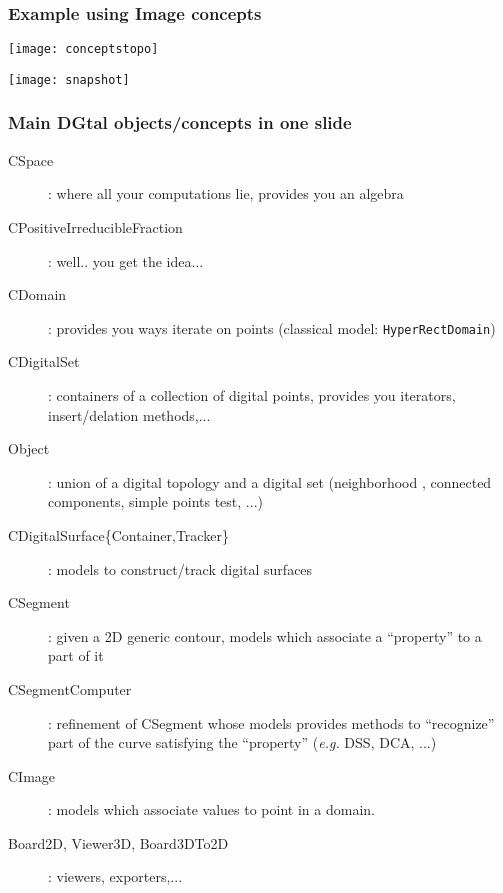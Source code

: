 \documentclass[8pt]{beamer}
\begin{document}
\begin{frame}
\frametitle{Example using Image concepts}
  \centering \texttt{[image: conceptstopo]}
\end{frame}



\begin{frame}
  \centering \texttt{[image: snapshot]}
\end{frame}

\begin{frame}
  \frametitle{Main DGtal objects/concepts in one slide}

  \begin{description}
    \item[CSpace]: where all your computations lie, provides you an algebra 

    \item[CPositiveIrreducibleFraction]: well.. you get the idea...

    \item[CDomain]:  provides you ways iterate on points (classical
      model: \texttt{HyperRectDomain}) 
    \item[CDigitalSet]: containers of a collection of digital points,
      provides you iterators, insert/delation methods,...

    \item[Object]: union of  a digital topology and a digital set
      (neighborhood , connected components, simple points test, ...)

    \item[CDigitalSurface\{Container,Tracker\}]: models to
      construct/track  digital surfaces 

\vspace{0.5cm}

    \item[CSegment]: given a 2D generic contour, models which
      associate a ``property'' to a part of it

    \item[CSegmentComputer]: refinement of CSegment whose models
      provides methods to ``recognize'' part of the curve satisfying
      the ``property'' (\emph{e.g.} DSS, DCA, ...)

\vspace{0.5cm}

    \item[CImage]: models which associate values to point in a
      domain. 

\vspace{0.5cm}

    \item[Board2D, Viewer3D, Board3DTo2D]: viewers, exporters,...

  \end{description}

\end{frame}


\end{document}
